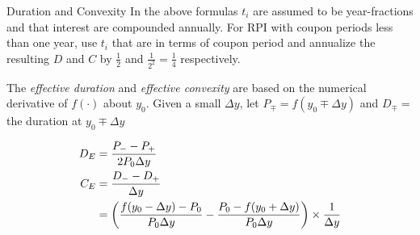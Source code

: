 \documentclass{article}
\begin{document}
\begin{section}{Duration and Convexity}
In the above formulas $t_i$ are assumed to be year-fractions and that
interest are compounded annually. For RPI with coupon periods less than
one year, use $t_i$ that are in terms of coupon period and annualize
the resulting $D$ and $C$ by $\frac{1}{2}$ and $\frac{1}{2^2} = \frac{1}{4}$
respectively.

The \emph{effective duration} and \emph{effective convexity} are based on
the numerical derivative of $f(\cdot)$ about $y_0$. Given a small $\Delta y$,
let $P_{\mp} = f(y_0 \mp \Delta y)$ and $D_{\mp} = $ the duration at 
$y_0 \mp \Delta y$

\begin{align}
D_E &= \frac{P_{-} - P_{+}}{2 P_0 \Delta y} \notag\\
C_E &= \frac{D_{-} - D_{+}}{\Delta y} \notag\\
    &= \left(\frac{f(y_0 - \Delta y) - P_0}{P_0 \Delta y} - 
              \frac{P_0 - f(y_0 + \Delta y)}{P_0 \Delta y}\right)
       \times \frac{1}{\Delta y}\notag
\end{align}
\end{section}
\end{document}
